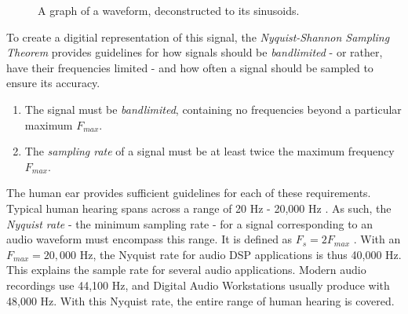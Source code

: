 \begin{figure}[h] %
\begin{center}
	\caption{A graph of a waveform, deconstructed to its sinusoids.}
\end{center}
\end{figure}

To create a digitial representation of this signal, the \textit{Nyquist-Shannon Sampling Theorem} provides guidelines for how signals should be \textit{bandlimited} - or rather, have their frequencies limited - and how often a signal should be sampled to ensure its accuracy.

\begin{defn}\label{def3}
\hfill
\begin{enumerate}
	\item The signal must be \textit{bandlimited}, containing no frequencies beyond a particular maximum $F_{max}$.
	\item The \textit{sampling rate} of a signal must be at least twice the maximum frequency $F_{max}$.
\end{enumerate}
\end{defn}

The human ear provides sufficient guidelines for each of these requirements. Typical human hearing spans across a range of 20 Hz - 20,000 Hz \cite{Ling_2016}. As such, the \textit{Nyquist rate} - the minimum sampling rate - for a signal corresponding to an audio waveform must encompass this range. It is defined as $F_s = 2F_{max}$ \cite{Orfanidis_1998}. With an $F_{max} = 20,000$ Hz, the Nyquist rate for audio DSP applications is thus 40,000 Hz. This explains the sample rate for several audio applications. Modern audio recordings use 44,100 Hz, and Digital Audio Workstations usually produce with 48,000 Hz. With this Nyquist rate, the entire range of human hearing is covered.

